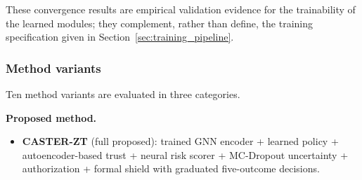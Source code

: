 \documentclass[10pt,journal,compsoc]{IEEEtran}
\begin{document}
\noindent
These convergence results are empirical validation evidence for the trainability of the learned modules; they complement, rather than define, the training specification given in Section~\ref{sec:training_pipeline}.

\subsubsection{Method variants}
Ten method variants are evaluated in three categories.

\noindent\textbf{Proposed method.}
\begin{itemize}
    \item \textbf{CASTER-ZT} (full proposed): trained GNN encoder + learned policy + autoencoder-based trust + neural risk scorer + MC-Dropout uncertainty + authorization + formal shield with graduated five-outcome decisions.
\end{itemize}
\end{document}
